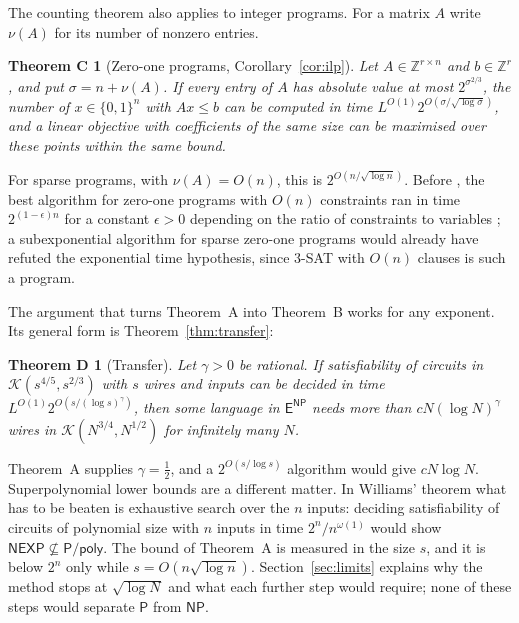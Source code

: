 \documentclass[11pt,reqno]{amsart}
\numberwithin{equation}{section}
\theoremstyle{plain}
\newtheorem*{theoremC}{Theorem C}
\newtheorem*{theoremD}{Theorem D}
\theoremstyle{definition}
\theoremstyle{remark}
\newcommand{\Z}{\mathbb{Z}}
\newcommand{\cK}{\mathcal{K}}
\newcommand{\Pc}{\mathsf{P}}
\newcommand{\NP}{\mathsf{NP}}
\newcommand{\ENP}{\mathsf{E}^{\mathsf{NP}}}
\newcommand{\NEXP}{\mathsf{NEXP}}
\newcommand{\Ppoly}{\mathsf{P}/\mathsf{poly}}
\begin{document}
The counting theorem also applies to integer programs. For a matrix $A$ write
$\nu(A)$ for its number of nonzero entries.

\begin{theoremC}[Zero-one programs, Corollary~\ref{cor:ilp}]
Let $A\in\Z^{r\times n}$ and $b\in\Z^r$, and put $\sigma=n+\nu(A)$. If every
entry of $A$ has absolute value at most $2^{\sigma^{2/3}}$, the number of
$x\in\{0,1\}^n$ with $Ax\le b$ can be computed in time
$L^{O(1)}2^{O(\sigma/\sqrt{\log\sigma})}$, and a linear objective with
coefficients of the same size can be maximised over these points within the
same bound.
\end{theoremC}

For sparse programs, with $\nu(A)=O(n)$, this is $2^{O(n/\sqrt{\log n})}$.
Before \cite{OAI26}, the best algorithm for zero-one programs with $O(n)$
constraints ran in time $2^{(1-\epsilon)n}$ for a constant $\epsilon>0$
depending on the ratio of constraints to variables \cite{ILPS14}; a
subexponential algorithm for sparse zero-one programs would already have refuted
the exponential time hypothesis, since $3$-SAT with $O(n)$ clauses is such a
program.

The argument that turns Theorem~A into Theorem~B works for any exponent. Its
general form is Theorem~\ref{thm:transfer}:

\begin{theoremD}[Transfer]
Let $\gamma>0$ be rational. If satisfiability of circuits in $\cK(s^{4/5},s^{2/3})$ with
$s$ wires and inputs can be decided in time $L^{O(1)}2^{O(s/(\log s)^\gamma)}$,
then some language in $\ENP$ needs more than $cN(\log N)^\gamma$ wires in
$\cK(N^{3/4},N^{1/2})$ for infinitely many $N$.
\end{theoremD}

Theorem~A supplies $\gamma=\tfrac12$, and a $2^{O(s/\log s)}$ algorithm would
give $cN\log N$. Superpolynomial lower bounds are a different matter. In
Williams' theorem \cite{Wil13} what has to be beaten is exhaustive search over
the $n$ inputs: deciding satisfiability of circuits of polynomial size with $n$
inputs in time $2^n/n^{\omega(1)}$ would show $\NEXP\not\subseteq\Ppoly$. The
bound of Theorem~A is measured in the size $s$, and it is below $2^n$ only while
$s=O(n\sqrt{\log n})$. Section~\ref{sec:limits} explains why the method stops
at $\sqrt{\log N}$ and what each further step would require; none of these
steps would separate $\Pc$ from $\NP$.
\end{document}
